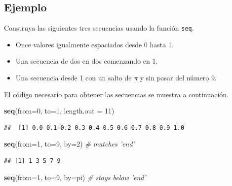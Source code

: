 \documentclass[10pt,]{krantz}
\makeatletter
\newenvironment{Shaded}{\begin{snugshade}}{\end{snugshade}}
\newcommand{\KeywordTok}[1]{\textcolor[rgb]{0.13,0.29,0.53}{\textbf{{#1}}}}
\newcommand{\DataTypeTok}[1]{\textcolor[rgb]{0.13,0.29,0.53}{{#1}}}
\newcommand{\DecValTok}[1]{\textcolor[rgb]{0.00,0.00,0.81}{{#1}}}
\newcommand{\CommentTok}[1]{\textcolor[rgb]{0.56,0.35,0.01}{\textit{{#1}}}}
\newcommand{\NormalTok}[1]{{#1}}
\providecommand{\tightlist}{%
  \setlength{\itemsep}{0pt}\setlength{\parskip}{0pt}}
\newenvironment{kframe}{%
\medskip{}
\setlength{\fboxsep}{.8em}
 \def\at@end@of@kframe{}%
 \ifinner\ifhmode%
  \def\at@end@of@kframe{\end{minipage}}%
  \begin{minipage}{\columnwidth}%
 \fi\fi%
 \def\FrameCommand##1{\hskip\@totalleftmargin \hskip-\fboxsep
 \colorbox{shadecolor}{##1}\hskip-\fboxsep
     \hskip-\linewidth \hskip-\@totalleftmargin \hskip\columnwidth}%
 \MakeFramed {\advance\hsize-\width
   \@totalleftmargin\z@ \linewidth\hsize
   \@setminipage}}%
 {\par\unskip\endMakeFramed%
 \at@end@of@kframe}
\renewenvironment{Shaded}{\begin{kframe}}{\end{kframe}}
\makeatother
\begin{document}
\subsection*{Ejemplo}\label{ejemplo-10}


Construya las siguientes tres secuencias usando la función \texttt{seq}.

\begin{itemize}
\tightlist
\item
  Once valores igualmente espaciados desde 0 hasta 1.
\item
  Una secuencia de dos en dos comenzando en 1.
\item
  Una secuencia desde 1 con un salto de \(\pi\) y sin pasar del número
  9.
\end{itemize}

El código necesario para obtener las secuencias se muestra a
continuación.

\begin{Shaded}
\begin{Highlighting}[]
\KeywordTok{seq}\NormalTok{(}\DataTypeTok{from=}\DecValTok{0}\NormalTok{, }\DataTypeTok{to=}\DecValTok{1}\NormalTok{, }\DataTypeTok{length.out =} \DecValTok{11}\NormalTok{)}
\end{Highlighting}
\end{Shaded}

\begin{verbatim}
##  [1] 0.0 0.1 0.2 0.3 0.4 0.5 0.6 0.7 0.8 0.9 1.0
\end{verbatim}

\begin{Shaded}
\begin{Highlighting}[]
\KeywordTok{seq}\NormalTok{(}\DataTypeTok{from=}\DecValTok{1}\NormalTok{, }\DataTypeTok{to=}\DecValTok{9}\NormalTok{, }\DataTypeTok{by=}\DecValTok{2}\NormalTok{)  }\CommentTok{# matches 'end'}
\end{Highlighting}
\end{Shaded}

\begin{verbatim}
## [1] 1 3 5 7 9
\end{verbatim}

\begin{Shaded}
\begin{Highlighting}[]
\KeywordTok{seq}\NormalTok{(}\DataTypeTok{from=}\DecValTok{1}\NormalTok{, }\DataTypeTok{to=}\DecValTok{9}\NormalTok{, }\DataTypeTok{by=}\NormalTok{pi) }\CommentTok{# stays below 'end'}
\end{Highlighting}
\end{Shaded}
\end{document}
